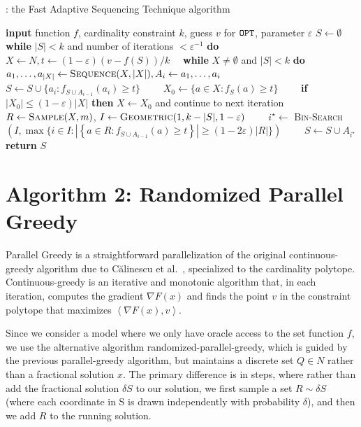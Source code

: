 \documentclass[11pt, a4paper]{article}
\begin{document}
\begin{algorithm}[H]
\caption{\algoptimized: the Fast Adaptive Sequencing Technique algorithm}
\begin{algorithmic}
    \STATE \textbf{input}  function $f$, cardinality constraint $k$, guess $v$ for $\texttt{OPT}$, parameter $\varepsilon$
    \STATE 	 $S \leftarrow \emptyset $
    \STATE  \textbf{while} $|S| < k$ and number of  iterations  $< \varepsilon^{-1}$ \textbf{do}
    \STATE   \ \  $X \leftarrow N,  t \leftarrow (1-\varepsilon) (v - f(S))/k$
	\STATE   \ \ \textbf{while} $X \neq \emptyset$ and $|S| < k$  \textbf{do}
	\STATE  \ \ \ \   $a_1, \ldots, a_{|X|} \leftarrow \textsc{Sequence}(X, |X|), A_i \leftarrow a_1, \ldots, a_i$
	\STATE \ \ \ \   $S \leftarrow S \cup \{a_i : f_{S \cup A_{i-1}}(a_i) \geq t \}$
	\STATE \ \ \ \ $X_0 \leftarrow \{a \in X : f_{S}(a) \geq t\}$
	\STATE \ \ \ \   \textbf{if} $|X_0| \leq (1 - \varepsilon) |X|$ \textbf{then} $X \leftarrow X_0$ and continue to  next iteration
	\STATE \ \ \ \  $R \leftarrow \textsc{Sample}(X, m)$, $I \leftarrow \textsc{Geometric}(1, k - |S|, 1 - \varepsilon)$
    \STATE \ \ \ \  $i^{\star} \leftarrow$ \textsc{Bin-Search}$(I,  \max \{i  \in I : |\left\{a \in R : f_{S \cup A_{i-1}}(a) \geq   t \right\}| \geq (1 - 2 \varepsilon) |R|\})$ 
	\STATE \ \ \ \  $S \leftarrow S \cup A_{i^{\star} }$
    	\STATE \textbf{return} $S$
  \end{algorithmic}
  \label{alg:main}
\end{algorithm}
\section{Algorithm 2: Randomized Parallel Greedy}
Parallel Greedy is a straightforward parallelization of the original continuous-greedy algorithm due to Călinescu et al.~\cite{CGC11}, specialized to the cardinality polytope. Continuous-greedy is an iterative and monotonic algorithm that, in each iteration, computes the gradient $\nabla F(x)$ and finds the point $v$ in the constraint polytope that maximizes
$\left<\nabla F(x), v\right>$. 

Since we consider a model where we only have oracle access to the set function $f$, we use the alternative algorithm randomized-parallel-greedy, which is guided by the previous parallel-greedy algorithm, but maintains a discrete set $Q \in N$ rather than a fractional solution $x$. The primary difference is in steps, where rather than add the fractional solution $\delta S$ to our solution, we first sample a set $R\sim\delta S$ (where each coordinate in S is drawn independently with probability $\delta$), and then we add $R$ to the running solution.
\end{document}
